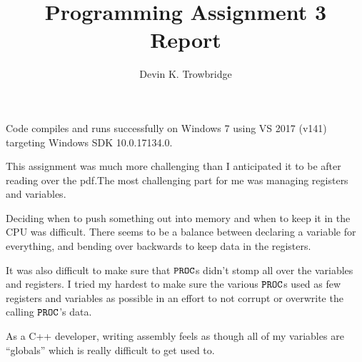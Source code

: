 \documentclass[a4paper,10pt]{article}
\title{Programming Assignment 3 Report}
\author{Devin K. Trowbridge}
\begin{document}
\maketitle

Code compiles and runs successfully on Windows 7 using VS 2017 (v141) targeting Windows SDK 10.0.17134.0.

This assignment was much more challenging than I anticipated it to be after reading over the pdf.The most challenging part for me was managing registers and variables. 

Deciding when to push something out into memory and when to keep it in the CPU was difficult. There seems to be a balance between declaring a variable for everything, and bending over backwards to keep data in the registers.

It was also difficult to make sure that $\verb|PROC|$s didn't stomp all over the variables and registers. I tried my hardest to make sure the various $\verb|PROC|$s used as few registers and variables as possible in an effort to not corrupt or overwrite the calling $\verb|PROC|$'s data.

As a C++ developer, writing assembly feels as though all of my variables are ``globals'' which is really difficult to get used to.
\end{document}
